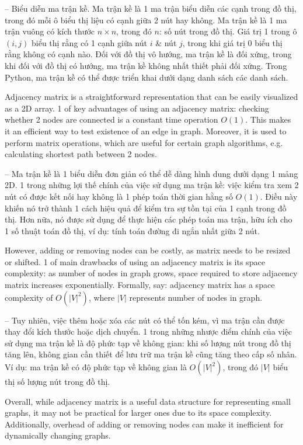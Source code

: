 \documentclass{article}
\begin{document}
\begin{itemize}
\begin{itemize}
\begin{itemize}
            -- {\sf Biểu diễn ma trận kề.} Ma trận kề là 1 ma trận biểu diễn các cạnh trong đồ thị, trong đó mỗi ô biểu thị liệu có cạnh giữa 2 nút hay không. Ma trận kề là 1 ma trận vuông có kích thước $n\times n$, trong đó $n$: số nút trong đồ thị. Giá trị 1 trong ô $(i, j)$ biểu thị rằng có 1 cạnh giữa nút $i$ \& nút $j$, trong khi giá trị 0 biểu thị rằng không có cạnh nào. Đối với đồ thị vô hướng, ma trận kề là đối xứng, trong khi đối với đồ thị có hướng, ma trận kề không nhất thiết phải đối xứng. Trong Python, ma trận kề có thể được triển khai dưới dạng danh sách các danh sách.

            Adjacency matrix is a straightforward representation that can be easily visualized as a 2D array. 1 of key advantages of using an adjacency matrix: checking whether 2 nodes are connected is a constant time operation $O(1)$. This makes it an efficient way to test existence of an edge in graph. Moreover, it is used to perform matrix operations, which are useful for certain graph algorithms, e.g. calculating shortest path between 2 nodes.

            -- Ma trận kề là 1 biểu diễn đơn giản có thể dễ dàng hình dung dưới dạng 1 mảng 2D. 1 trong những lợi thế chính của việc sử dụng ma trận kề: việc kiểm tra xem 2 nút có được kết nối hay không là 1 phép toán thời gian hằng số $O(1)$. Điều này khiến nó trở thành 1 cách hiệu quả để kiểm tra sự tồn tại của 1 cạnh trong đồ thị. Hơn nữa, nó được sử dụng để thực hiện các phép toán ma trận, hữu ích cho 1 số thuật toán đồ thị, ví dụ: tính toán đường đi ngắn nhất giữa 2 nút.

            However, adding or removing nodes can be costly, as matrix needs to be resized or shifted. 1 of main drawbacks of using an adjacency matrix is its space complexity: as number of nodes in graph grows, space required to store adjacency matrix increases exponentially. Formally, say: adjacency matrix has a space complexity of $O(|V|^2)$, where $|V|$ represents number of nodes in graph.

            -- Tuy nhiên, việc thêm hoặc xóa các nút có thể tốn kém, vì ma trận cần được thay đổi kích thước hoặc dịch chuyển. 1 trong những nhược điểm chính của việc sử dụng ma trận kề là độ phức tạp về không gian: khi số lượng nút trong đồ thị tăng lên, không gian cần thiết để lưu trữ ma trận kề cũng tăng theo cấp số nhân. Ví dụ: ma trận kề có độ phức tạp về không gian là $O(|V|^2)$, trong đó $|V|$ biểu thị số lượng nút trong đồ thị.

            Overall, while adjacency matrix is a useful data structure for representing small graphs, it may not be practical for larger ones due to its space complexity. Additionally, overhead of adding or removing nodes can make it inefficient for dynamically changing graphs.


\end{itemize}
\end{itemize}
\end{itemize}
\end{document}
